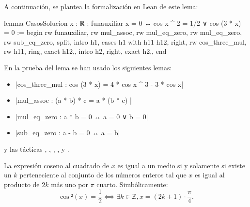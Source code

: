A continuación, se plantea la formalización en Lean de este lema:
\begin{leancode}
lemma CasosSolucion
  {x : ℝ}
  : funauxiliar x = 0 ↔ cos x ^ 2 = 1/2 ∨ cos (3 * x) = 0 :=
begin
  rw funauxiliar,
  rw mul_assoc,
  rw mul_eq_zero,
  rw mul_eq_zero,
  rw sub_eq_zero,
  split,
  { intro h1,
    cases h1 with h11 h12,
    right,
    rw cos_three_mul,
    rw h11,
    ring,
    exact h12,},
  { intro h2,
    right,
    exact h2,},
end
\end{leancode}

En la prueba del lema se han usado los siguientes lemas:
\begin{itemize}
\item {}|cos_three_mul : cos (3 * x) = 4 * cos x ^ 3 - 3 * cos x|
\item {}|mul_assoc : (a * b) * c = a * (b * c) |
\item {}|mul_eq_zero : a * b = 0 ↔ a = 0 ∨ b = 0|
\item {}|sub_eq_zero : a - b = 0 ↔ a = b|
\end{itemize}
y las tácticas
,
,
,
,
 y
.

\begin{lema}[SolucionCosenoCuadrado]\label{lemaCosenoCuadrado}
  La expresión coseno al cuadrado de \(x\) es igual a un medio si y
  solamente si existe un \(k\) perteneciente al conjunto de los números
  enteros tal que \(x\) es igual al producto de \(2k\) más uno por \(π\)
  cuarto. Simbólicamente:
  \begin{equation}\label{problema2}
    \cos²(x) = \frac{1}{2} ⟺ ∃ k ∈ ℤ, x = (2k+1)⋅\frac{π}{4}.
  \end{equation}
\end{lema}

